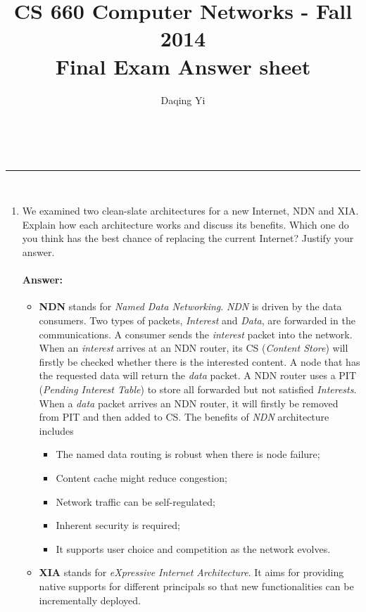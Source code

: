 \documentclass[a4paper,11pt]{article}
\makeatletter
\newcommand{\linia}{\rule{\linewidth}{0.5pt}}
\theoremstyle{mytheor}
\renewcommand{\maketitle}{
\begin{center}
\vspace{2ex}
{\huge \textsc{\@title}}
\vspace{1ex}
\\
\linia\\
\@author \hfill \@date
\vspace{4ex}
\end{center}
}
\makeatother
\begin{document}
\title{CS 660 Computer Networks - Fall 2014 \\ Final Exam Answer sheet}

\author{Daqing Yi}

\date{}

\maketitle

\begin{enumerate}
\item 
We examined two clean-slate architectures for a new Internet, NDN and XIA. 
Explain how each architecture works and discuss its benefits. 
Which one do you think has the best chance of replacing the current Internet?
Justify your answer.
\paragraph{Answer:}
\begin{itemize}
\item
\textbf{NDN} stands for \emph{Named Data Networking}.
\emph{NDN} is driven by the data consumers.
Two types of packets, \emph{Interest} and \emph{Data}, are forwarded in the communications.
A consumer sends the \emph{interest} packet into the network.
When an \emph{interest} arrives at an NDN router, its CS (\emph{Content Store}) will firstly be checked whether there is the interested content.
A node that has the requested data will return the \emph{data} packet.
A NDN router uses a PIT (\emph{Pending Interest Table}) to store all forwarded but not satisfied \emph{Interests}.
When a \emph{data} packet arrives an NDN router, it will firstly be removed from PIT and then added to CS.
The benefits of \emph{NDN} architecture includes
\begin{itemize}
	\item The named data routing is robust when there is node failure;
	\item Content cache might reduce congestion;
	\item Network traffic can be self-regulated;
	\item Inherent security is required;
	\item It supports user choice and competition as the network evolves.
\end{itemize}
\item
\textbf{XIA} stands for \emph{eXpressive Internet Architecture}.
It aims for providing native supports for different principals so that new functionalities can be incrementally deployed.

\end{itemize}
\end{enumerate}
\end{document}
